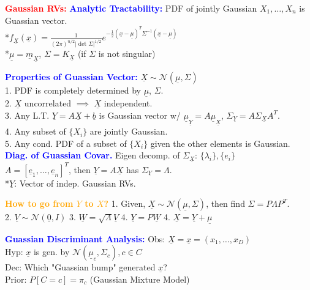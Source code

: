 \documentclass[5pt]{extarticle} %
\begin{document}
\begin{paracol}{3}
{    \textcolor{red}{\textbf{Gaussian RVs:}} \textcolor{blue}{\textbf{Analytic Tractability:}} PDF of jointly Gaussian $X_1, \ldots, X_n$ is Guassian vector. \\
    *$f_{\underline{X}} (\underline{x}) = \frac{1}{(2\pi)^{n/2} |\det \Sigma|^{1/2}} e^{-\frac{1}{2} (\underline{x} - \underline{\mu})^T \Sigma^{-1} (\underline{x} - \underline{\mu})}$ \\ 
    *$\underline{\mu} = \underline{m}_{\underline{X}}$, $\Sigma = K_{\underline{X}}$ (if $\Sigma$ is not singular)

    \textcolor{blue}{\textbf{Properties of Guassian Vector:}} $\underline{X} \sim \mathcal{N} (\underline{\mu}, \Sigma)$ \\
    1. PDF is completely determined by $\underline{\mu}$, $\Sigma$. \\
    2. $\underline{X}$ uncorrelated $\implies$ $\underline{X}$ independent. \\
    3. Any L.T. $\underline{Y} = A \underline{X} + \underline{b}$ is Gaussian vector w/ $\underline{\mu}_{\underline{Y}} = A \underline{\mu}_{\underline{X}}$, $\Sigma_{\underline{Y}} = A \Sigma_{\underline{X}} A^T$. \\
    4. Any subset of $\{X_i\}$ are jointly Gaussian. \\
    5. Any cond. PDF of a subset of $\{X_i\}$ given the other elements is Gaussian. \\

    \textcolor{blue}{\textbf{Diag. of Guassian Covar.}} Eigen decomp. of $\Sigma_{\underline{X}}$: $\{\lambda_i\}, \{e_i\}$ \\
    $A = [\underline{e}_1, \ldots, \underline{e}_n]^T$, then $\underline{Y} = A \underline{X}$ has $\Sigma_{\underline{Y}} = \Lambda$. \\
    *$\underline{Y}$: Vector of indep. Gaussian RVs.

    \textcolor{orange}{\textbf{How to go from $Y$ to $X$?}} 1. Given, $\underline{X} \sim \mathcal{N}(\underline{\mu}, \Sigma)$, then find $\Sigma = P \Lambda P^T$. \\
    2. $\underline{V} \sim \mathcal{N} (\underline{0}, I)$ 3. $\underline{W} = \sqrt{\Lambda} \underline{V}$ 4. $\underline{Y} = P \underline{W}$ 4. $\underline{X} = \underline{Y} + \underline{\mu}$

    \textcolor{blue}{\textbf{Guassian Discriminant Analysis:}} Obs: $\underline{X} = \underline{x} = (x_1,\ldots,x_D)$ \\
    Hyp: $\underline{x}$ is gen. by $\mathcal{N} (\underline{\mu}_c, \Sigma_c), c \in C$ \\
    Dec: Which "Guassian bump" generated $\underline{x}$? \\
    Prior: $P[C = c] = \pi_c$  (Gaussian Mixture Model) \\

}
\end{paracol}
\end{document}
